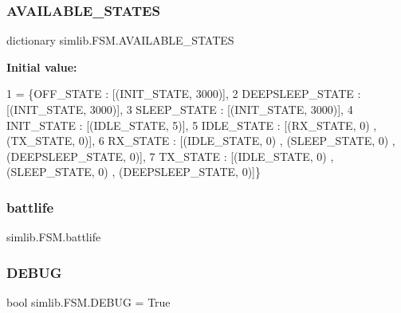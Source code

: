 \subsubsection{\texorpdfstring{A\+V\+A\+I\+L\+A\+B\+L\+E\+\_\+\+S\+T\+A\+T\+ES}{AVAILABLE\_STATES}}
{\footnotesize\ttfamily dictionary simlib.\+F\+S\+M.\+A\+V\+A\+I\+L\+A\+B\+L\+E\+\_\+\+S\+T\+A\+T\+ES}

{\bfseries Initial value\+:}
\begin{DoxyCode}
1 =  \{OFF\_STATE : [(INIT\_STATE, 3000)],
2                         DEEPSLEEP\_STATE : [(INIT\_STATE, 3000)],
3                         SLEEP\_STATE : [(INIT\_STATE, 3000)],
4                         INIT\_STATE : [(IDLE\_STATE, 5)],
5                         IDLE\_STATE : [(RX\_STATE, 0) , (TX\_STATE, 0)],
6                         RX\_STATE : [(IDLE\_STATE, 0) , (SLEEP\_STATE, 0) , (DEEPSLEEP\_STATE, 0)],
7                         TX\_STATE : [(IDLE\_STATE, 0) , (SLEEP\_STATE, 0) , (DEEPSLEEP\_STATE, 0)]\}
\end{DoxyCode}
\mbox{\label{namespacesimlib_1_1_f_s_m_a5284a2db218c3d24e2cd3228c03a02a3}} 
\subsubsection{\texorpdfstring{battlife}{battlife}}
{\footnotesize\ttfamily simlib.\+F\+S\+M.\+battlife}

\mbox{\label{namespacesimlib_1_1_f_s_m_a1953119b522c9596d79f398f2519976e}} 
\subsubsection{\texorpdfstring{D\+E\+B\+UG}{DEBUG}}
{\footnotesize\ttfamily bool simlib.\+F\+S\+M.\+D\+E\+B\+UG = True}

\mbox{\label{namespacesimlib_1_1_f_s_m_aafe5837c1b03313c6f9c79aaa04a7652}} 
